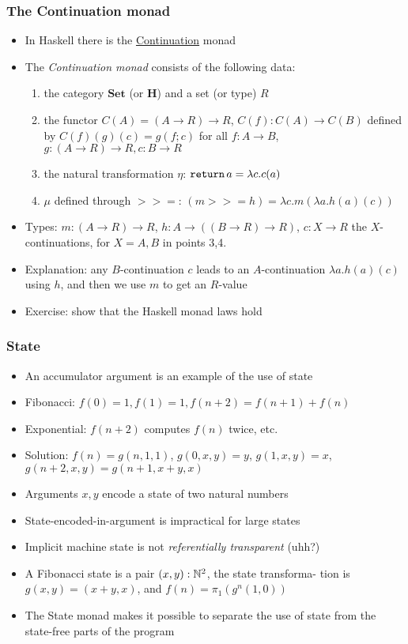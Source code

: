 \documentclass[handout]{beamer}
\newcommand{\bfsf}[1]{{\boldsymbol{#1}}}
\newcommand{\Set}{\bfsf{Set}}
\newcommand{\HH}{\bfsf{H}}
\newcommand{\bind}{{>}\!\!{>}\!{=}}
\newcommand{\ttt}[1]{\text{\tt #1}}
\begin{document}
\frame
  {   
    \frametitle{The Continuation monad}\label{Mon5:MonadCont}

 \begin{itemize}[<+->]
\item In Haskell there is the 
\href{https://wiki.haskell.org/All_About_Monads\#The_Continuation\_monad}%
{\color{blue}Continuation} monad
\item The \emph{Continuation monad} consists of the following data:
 \begin{enumerate}
    \item the category $\Set$ (or $\HH$) and a set (or type) $R$
    \item the functor $C(A) = (A\to R)\to R$, $C(f) : C(A)\to C(B)$ defined by
$C(f)(g)(c) = g(f;c)$ for all $f: A\to B$, $g: (A\to R)\to R, c: B\to R$ 
    \item the natural transformation $\eta$: $\ttt{return}\, a = \lambda c. c(a)$
    \item $\mu$ defined through $\bind$: %
$(m \bind h) =  \lambda c. m(\lambda a. h(a)(c))$
 \end{enumerate}
\item Types: $m: (A\to R)\to R$, $h: A\to ((B\to R)\to R)$, 
$c: X\to R$ the $X$-continuations, for $X=A,B$ in points 3,4.
\item Explanation: any $B$-continuation $c$ leads to an $A$-continuation 
$\lambda a. h(a)(c)$ using $h$, and then we use $m$ to get an $R$-value
\item Exercise: show that the Haskell monad laws hold
 \end{itemize}

 }

\frame
  {   
    \frametitle{State}\label{Mon5:State}

 \begin{itemize}[<+->]
\item An accumulator argument is an example of the use of state
\item Fibonacci: $f(0)=1, f(1)=1, f(n+2)=f(n+1)+f(n)$
\item Exponential: $f(n+2)$ computes $f(n)$ twice, etc.
\item Solution: $f(n)=g(n,1,1)$, $g(0,x,y)=y$, $g(1,x,y)=x$, $g(n+2,x,y)=g(n+1,x+y,x)$
\item Arguments $x,y$ encode a state of two natural numbers 
\item State-encoded-in-argument is impractical  for large states
\item Implicit machine state is not \emph{referentially transparent} (uhh?)
\item A Fibonacci state is a pair $(x,y) : \mathbb{N}^2$, the state transforma- tion
is $g(x,y)=(x+y,x)$, and $f(n) = \pi_1(g^n(1,0))$
\item The State monad makes it possible to separate the use of
state from the state-free parts of the program
 \end{itemize}

 }
\end{document}
